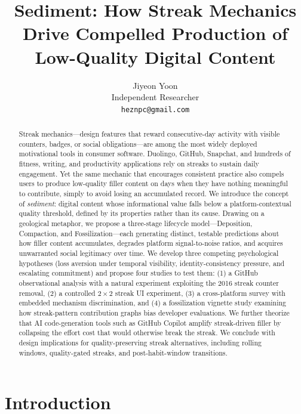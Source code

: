 \documentclass[12pt]{article}
\title{Sediment: How Streak Mechanics Drive Compelled Production of Low-Quality Digital Content}
\author{Jiyeon Yoon\\
Independent Researcher\\
\texttt{heznpc@gmail.com}}
\date{}
\begin{document}
\maketitle

\begin{abstract}
Streak mechanics---design features that reward consecutive-day activity with visible counters, badges, or social obligations---are among the most widely deployed motivational tools in consumer software. Duolingo, GitHub, Snapchat, and hundreds of fitness, writing, and productivity applications rely on streaks to sustain daily engagement. Yet the same mechanic that encourages consistent practice also compels users to produce low-quality filler content on days when they have nothing meaningful to contribute, simply to avoid losing an accumulated record. We introduce the concept of \emph{sediment}: digital content whose informational value falls below a platform-contextual quality threshold, defined by its properties rather than its cause. Drawing on a geological metaphor, we propose a three-stage lifecycle model---Deposition, Compaction, and Fossilization---each generating distinct, testable predictions about how filler content accumulates, degrades platform signal-to-noise ratios, and acquires unwarranted social legitimacy over time. We develop three competing psychological hypotheses (loss aversion under temporal visibility, identity-consistency pressure, and escalating commitment) and propose four studies to test them: (1) a GitHub observational analysis with a natural experiment exploiting the 2016 streak counter removal, (2) a controlled $2 \times 2$ streak UI experiment, (3) a cross-platform survey with embedded mechanism discrimination, and (4) a fossilization vignette study examining how streak-pattern contribution graphs bias developer evaluations. We further theorize that AI code-generation tools such as GitHub Copilot amplify streak-driven filler by collapsing the effort cost that would otherwise break the streak. We conclude with design implications for quality-preserving streak alternatives, including rolling windows, quality-gated streaks, and post-habit-window transitions.
\end{abstract}

\section{Introduction}
\label{sec:introduction}
\end{document}
